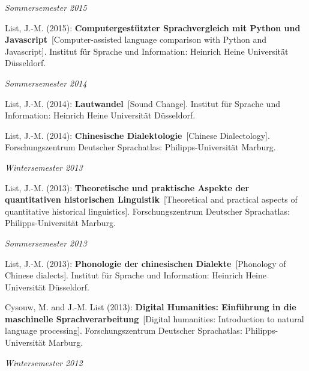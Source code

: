 \noindent\textit{Sommersemester 2015}\par\nopagebreak\vspace{0.25cm}
\nopagebreak\noindent List, J.-M. (2015): \textbf{Computergestützter Sprachvergleich mit Python und Javascript}\ [Computer-assisted language comparison with Python and Javascript]. Institut für Sprache und Information: Heinrich Heine Universität Düsseldorf.\vspace{0.25cm}
\par
\noindent\textit{Sommersemester 2014}\par\nopagebreak\vspace{0.25cm}
\nopagebreak\noindent List, J.-M. (2014): \textbf{Lautwandel}\ [Sound Change]. Institut für Sprache und Information: Heinrich Heine Universität Düsseldorf.\vspace{0.25cm}
\par
\nopagebreak\noindent List, J.-M. (2014): \textbf{Chinesische Dialektologie}\ [Chinese Dialectology]. Forschungszentrum Deutscher Sprachatlas: Philipps-Universität Marburg.\vspace{0.25cm}
\par
\noindent\textit{Wintersemester 2013}\par\nopagebreak\vspace{0.25cm}
\nopagebreak\noindent List, J.-M. (2013): \textbf{Theoretische und praktische Aspekte der quantitativen historischen Linguistik}\ [Theoretical and practical aspects of quantitative historical linguistics]. Forschungszentrum Deutscher Sprachatlas: Philipps-Universität Marburg.\vspace{0.25cm}
\par
\noindent\textit{Sommersemester 2013}\par\nopagebreak\vspace{0.25cm}
\nopagebreak\noindent List, J.-M. (2013): \textbf{Phonologie der chinesischen Dialekte}\ [Phonology of Chinese dialects]. Institut für Sprache und Information: Heinrich Heine Universität Düsseldorf.\vspace{0.25cm}
\par
\nopagebreak\noindent Cysouw, M. and J.-M. List (2013): \textbf{Digital Humanities: Einführung in die maschinelle Sprachverarbeitung}\ [Digital humanities: Introduction to natural language processing]. Forschungszentrum Deutscher Sprachatlas: Philipps-Universität Marburg.\vspace{0.25cm}
\par
\noindent\textit{Wintersemester 2012}\par\nopagebreak\vspace{0.25cm}
